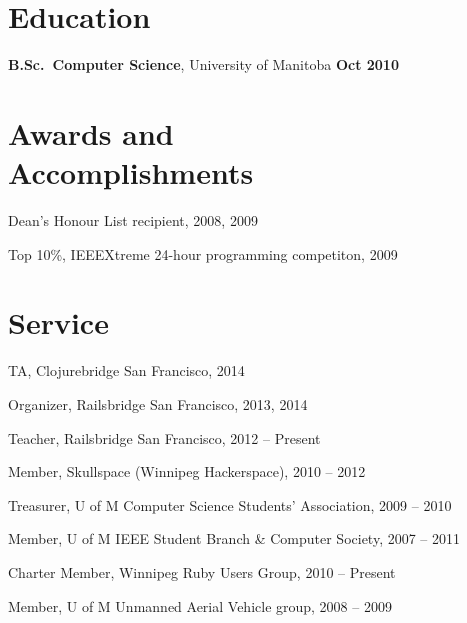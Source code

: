 \documentclass[margin,line,letterpaper]{resume}
\begin{document}
\begin{resume}
  \section{\mysidestyle Education}

  {\bf B.Sc.~Computer Science}, University of Manitoba \hfill {\bf Oct 2010}


  \section{\mysidestyle Awards and\\Accomplishments}

  \begin{list2}
    \item Dean's Honour List recipient, 2008, 2009
    \item Top 10\%, IEEEXtreme 24-hour programming competiton, 2009
  \end{list2}


  \section{\mysidestyle Service}

  \begin{list2}
    \item TA, Clojurebridge San Francisco, 2014
    \item Organizer, Railsbridge San Francisco, 2013, 2014
    \item Teacher, Railsbridge San Francisco, 2012 -- Present
    \item Member, Skullspace (Winnipeg Hackerspace), 2010 -- 2012
    \item Treasurer, U of M Computer Science Students' Association, 2009 -- 2010
    \item Member, U of M IEEE Student Branch \& Computer Society, 2007 -- 2011
    \item Charter Member, Winnipeg Ruby Users Group, 2010 -- Present
    \item Member, U of M Unmanned Aerial Vehicle group, 2008 -- 2009
 \end{list2}




\end{resume}
\end{document}
